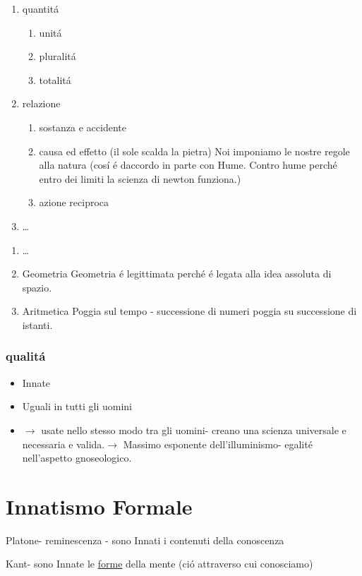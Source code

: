 \documentclass{article}
\begin{document}
\begin{enumerate}
    \item quantitá
    \begin{enumerate}
    \item unitá
    \item pluralitá
    \item totalitá
    \end{enumerate}
    \item relazione
    \begin{enumerate}
    \item sostanza e accidente
    \item causa ed effetto (il sole scalda la pietra) Noi imponiamo le nostre regole alla natura (cosí é daccordo in parte con Hume. Contro hume perché entro dei limiti la scienza di newton funziona.)
    \item azione reciproca
\end{enumerate}
    \item \dots
\end{enumerate}

\begin{enumerate}
    \item \dots
    \item Geometria
    Geometria é legittimata perché é legata alla idea assoluta di spazio.
    \item Aritmetica
    Poggia sul tempo - successione di numeri poggia su successione di istanti.
\end{enumerate}
\subsubsection{qualitá}
\begin{itemize}
\item Innate
\item Uguali in tutti gli uomini
\item $\to$ usate nello stesso modo tra gli uomini- creano una scienza universale e necessaria e valida.$\to$ Massimo esponente dell'illuminismo- egalité nell'aspetto gnoseologico.
\end{itemize}

\section{Innatismo Formale}
Platone- reminescenza - sono Innati i contenuti della conoscenza

Kant- sono Innate le \underline{forme} della mente (ció attraverso cui conosciamo)
\end{document}
